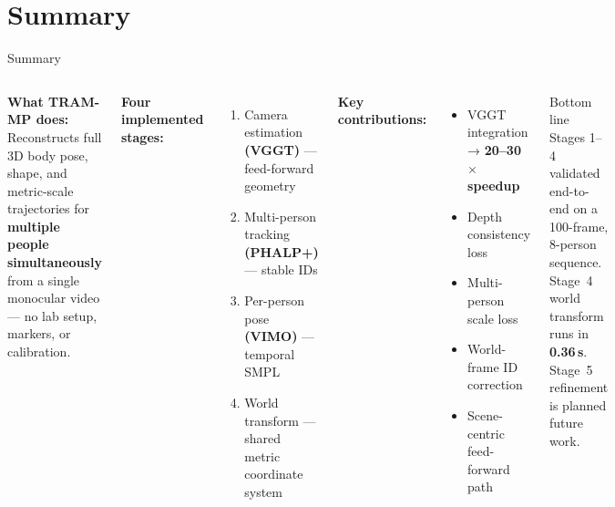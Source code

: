 \documentclass[aspectratio=169,11pt]{beamer}
\newcommand{\highlight}[1]{\textcolor{tamumaroon}{\textbf{#1}}}
\begin{document}
\section*{Summary}

\begin{frame}{Summary}
  \begin{columns}[T]
      \textbf{What TRAM-MP does:}\\
      Reconstructs full 3D body pose, shape, and metric-scale trajectories
      for \highlight{multiple people simultaneously} from a single monocular
      video — no lab setup, markers, or calibration.

      \vspace{0.8em}
      \textbf{Four implemented stages:}
      \begin{enumerate}
        \item Camera estimation \textbf{(VGGT)} — feed-forward geometry
        \item Multi-person tracking \textbf{(PHALP+)} — stable IDs
        \item Per-person pose \textbf{(VIMO)} — temporal SMPL
        \item World transform — shared metric coordinate system
      \end{enumerate}

      \textbf{Key contributions:}
      \begin{itemize}
        \item[\textcolor{novelcolor}{$\star$}] VGGT integration → \textbf{20--30$\times$ speedup}
        \item[\textcolor{novelcolor}{$\star$}] Depth consistency loss
        \item[\textcolor{novelcolor}{$\star$}] Multi-person scale loss
        \item[\textcolor{novelcolor}{$\star$}] World-frame ID correction
        \item[\textcolor{novelcolor}{$\star$}] Scene-centric feed-forward path
      \end{itemize}

      \vspace{0.6em}
      \begin{alertblock}{Bottom line}
        Stages 1--4 validated end-to-end on a 100-frame, 8-person sequence.
        Stage~4 world transform runs in \textbf{0.36\,s}.
        Stage~5 refinement is planned future work.
      \end{alertblock}
  \end{columns}
\end{frame}
\end{document}
